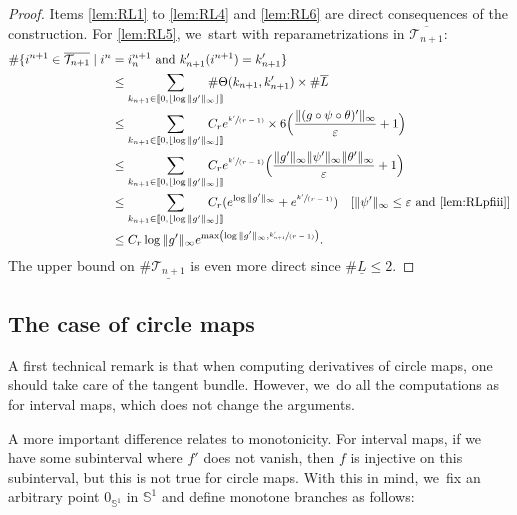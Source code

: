 \documentclass[JEP,XML,SOM,Unicode,NoFloatCountersInSection,published]{cedram}
\newcommand{\spfrac}[2]{\sfrac{#1}{(#2)}}
\theoremstyle{definition}
\newcommand{\bbS}{{\mathbb{S}}}
\begin{document}
\begin{proof}
Items \eqref{lem:RL1} to \eqref{lem:RL4} and \eqref{lem:RL6} are direct consequences of the construction. For \eqref{lem:RL5}, we~start with reparametrizations in $\overline{\mathcal{T}_{n+1}}$:
\begin{align*}
\# \{ i^{n+1} \in \overline{\mathcal{T}_{n+1}} \mid i^n &= i_n^{n+1} \text{ and } k_{n+1}'(i^{n+1}) = k_{n+1}' \}\\
&\leq \sum_{k_{n+1} \in [ \! [ 0, \lfloor \log \| g' \|_{\infty} \rfloor ]\!]} \hspace*{-5mm}\# \Theta(k_{n+1}, k'_{n+1}) \times \# \overline{L}\\
&\leq \sum_{k_{n+1} \in [ \! [ 0, \lfloor \log \| g' \|_{\infty} \rfloor ]\!]} \hspace*{-5mm}C_r e^{\spfrac{k'}{r-1}} \times 6 \Bigl (\frac{\| (g \circ \psi \circ \theta)' \|_{\infty}}{\varepsilon} + 1\Bigr)\\
&\leq \sum_{k_{n+1} \in [ \! [ 0, \lfloor \log \| g' \|_{\infty} \rfloor ]\!]} \hspace*{-5mm}C_r e^{\spfrac{k'}{r-1}} \Bigl (\frac{\| g' \|_{\infty} \| \psi' \|_{\infty} \| \theta' \|_{\infty}}{\varepsilon} + 1\Bigr)\\
&\leq \sum_{k_{n+1} \in [ \! [ 0, \lfloor \log \| g' \|_{\infty} \rfloor ]\!]} \hspace*{-5mm}C_r (e^{\log \| g' \|_{\infty}} + e^{\spfrac{k'}{r-1}})\quad[\| \psi' \|_{\infty} \leq \varepsilon \text{ and \eqref{lem:RLpfiii}}]\\
&\leq C_r \log \| g' \|_{\infty} e^{\max \left (\log \| g' \|_{\infty}, \spfrac{k_{n+1}'}{r-1} \right)}.
\end{align*}
The upper bound on $\# \underline{\mathcal{T}_{n+1}}$ is even more direct since $\# \underline{L} \leq 2$.
\end{proof}

\subsection{The case of circle maps}
\label{ssec:diff-int-cercle}

A first technical remark is that when computing derivatives of circle maps, one should take care of the tangent bundle.
However, we~do all the computations as for interval maps, which does not change the arguments.

A more important difference relates to monotonicity.
For interval maps, if we have some subinterval where $f'$ does not vanish, then $f$ is injective on this subinterval, but this is not true for circle maps.
With this in mind, we~fix an arbitrary point $0_{\bbS^1}$ in $\bbS^1$ and define monotone branches as follows:
\end{document}
